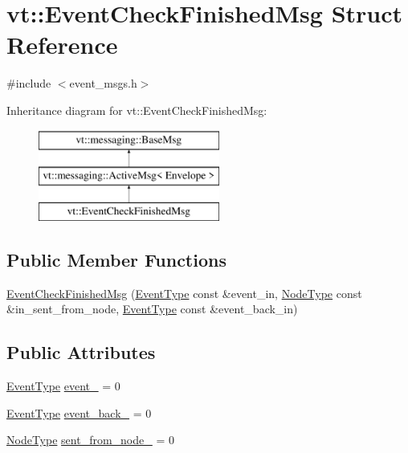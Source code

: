 \hypertarget{structvt_1_1_event_check_finished_msg}{}\section{vt\+:\+:Event\+Check\+Finished\+Msg Struct Reference}
\label{structvt_1_1_event_check_finished_msg}


{\ttfamily \#include $<$event\+\_\+msgs.\+h$>$}

Inheritance diagram for vt\+:\+:Event\+Check\+Finished\+Msg\+:\begin{figure}[H]
\begin{center}
\leavevmode
\includegraphics[height=3.000000cm]{structvt_1_1_event_check_finished_msg}
\end{center}
\end{figure}
\subsection*{Public Member Functions}
\begin{DoxyCompactItemize}
\item 
\hyperlink{structvt_1_1_event_check_finished_msg_ad951266e624f0bafb5e0995470a7a2ff}{Event\+Check\+Finished\+Msg} (\hyperlink{namespacevt_a009267401def7ae8bf201892222d060f}{Event\+Type} const \&event\+\_\+in, \hyperlink{namespacevt_a866da9d0efc19c0a1ce79e9e492f47e2}{Node\+Type} const \&in\+\_\+sent\+\_\+from\+\_\+node, \hyperlink{namespacevt_a009267401def7ae8bf201892222d060f}{Event\+Type} const \&event\+\_\+back\+\_\+in)
\end{DoxyCompactItemize}
\subsection*{Public Attributes}
\begin{DoxyCompactItemize}
\item 
\hyperlink{namespacevt_a009267401def7ae8bf201892222d060f}{Event\+Type} \hyperlink{structvt_1_1_event_check_finished_msg_afd40f61945ff804339310a0f062c20eb}{event\+\_\+} = 0
\item 
\hyperlink{namespacevt_a009267401def7ae8bf201892222d060f}{Event\+Type} \hyperlink{structvt_1_1_event_check_finished_msg_a1dac1707c01832350303c3b2900eef25}{event\+\_\+back\+\_\+} = 0
\item 
\hyperlink{namespacevt_a866da9d0efc19c0a1ce79e9e492f47e2}{Node\+Type} \hyperlink{structvt_1_1_event_check_finished_msg_a624c3fcecafca23a88567a16a8921d7f}{sent\+\_\+from\+\_\+node\+\_\+} = 0
\end{DoxyCompactItemize}

